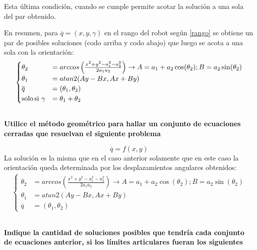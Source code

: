 \documentclass[a4paper,12pt]{article}
\begin{document}
Esta última condición, cuando se cumple permite acotar la solución a una sola del par obtenido.

En resumen, para $\overline{q} = (x, y, \gamma)$ en el rango del robot según \cref{rango} se obtiene un par de posibles soluciones (codo arriba y codo abajo) que luego se acota a una sola con la orientación:
\begin{align}
    \begin{cases}
        \theta_2 &= arccos\left(\frac{x^2 + y^2 - a_{1}^2 - a_{2}^2}{2a_{1}a_{2}}\right) \rightarrow A = a_1 + a_2\cos(\theta_2); B = a_2\sin(\theta_2)\\
        \theta_1 &=  atan2(Ay-Bx, Ax + By)\\
        \overline{q} &= (\theta_1, \theta_2)\\
        \text{solo\,si}\,\,\gamma &= \theta_1 + \theta_2
    \end{cases}
\end{align}

\subsection{}
\textbf{Utilice el método geométrico para hallar un conjunto de ecuaciones cerradas que resuelvan el siguiente problema}

\begin{equation*}
    \overline{q} = f\left(x,y\right)
\end{equation*}
La solución es la misma que en el caso anterior solamente que en este caso la orientación queda determinada por los desplazamientos angulares obtenidos:
\begin{align}
    \begin{cases}
        \theta_2 &= arccos\left(\frac{x^2 + y^2 - a_{1}^2 - a_{2}^2}{2a_{1}a_{2}}\right) \rightarrow A = a_1 + a_2\cos(\theta_2); B = a_2\sin(\theta_2)\\
        \theta_1 &=  atan2(Ay-Bx, Ax + By)\\
        \overline{q} &= (\theta_1, \theta_2)
    \end{cases}
\end{align}

\subsection{}
\textbf{Indique la cantidad de soluciones posibles que tendría cada conjunto de ecuaciones anterior, si los límites articulares fueran los siguientes}
\end{document}
